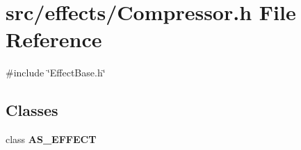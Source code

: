 \section{src/effects/\+Compressor.h File Reference}
\label{_compressor_8h}
{\ttfamily \#include \char`\"{}Effect\+Base.\+h\char`\"{}}\newline
\subsection*{Classes}
\begin{DoxyCompactItemize}
\item 
class \textbf{ A\+S\+\_\+\+E\+F\+F\+E\+CT}
\end{DoxyCompactItemize}
